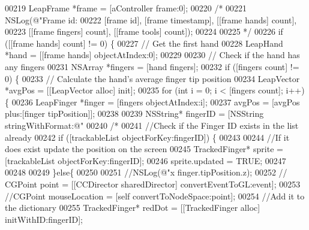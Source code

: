 \begin{DoxyCode}
00219     LeapFrame *frame = [aController frame:0];
00220     \textcolor{comment}{/*}
00221 \textcolor{comment}{     NSLog(@"Frame id: %
00222 \textcolor{comment}{     [frame id], [frame timestamp], [[frame hands] count],}
00223 \textcolor{comment}{     [[frame fingers] count], [[frame tools] count]);}
00224 \textcolor{comment}{     }
00225 \textcolor{comment}{     */}
00226     \textcolor{keywordflow}{if} ([[frame hands] count] != 0) \{
00227         \textcolor{comment}{// Get the first hand}
00228         LeapHand *hand = [[frame hands] objectAtIndex:0];
00229         
00230         \textcolor{comment}{// Check if the hand has any fingers}
00231         NSArray *fingers = [hand fingers];
00232         \textcolor{keywordflow}{if} ([fingers count] != 0) \{
00233             \textcolor{comment}{// Calculate the hand's average finger tip position}
00234             LeapVector *avgPos = [[LeapVector alloc] init];
00235             \textcolor{keywordflow}{for} (\textcolor{keywordtype}{int} i = 0; i < [fingers count]; i++) \{
00236                 LeapFinger *finger = [fingers objectAtIndex:i];
00237                 avgPos = [avgPos plus:[finger tipPosition]];
00238                 
00239                 NSString* fingerID = [NSString stringWithFormat:@"%
00240                 \textcolor{comment}{/*}
00241 \textcolor{comment}{                //Check if the Finger ID exists in the list already}
00242 \textcolor{comment}{                if ([trackableList objectForKey:fingerID]) \{}
00243 \textcolor{comment}{                    }
00244 \textcolor{comment}{                    //If it does exist update the position on the screen}
00245 \textcolor{comment}{                    TrackedFinger* sprite = [trackableList objectForKey:fingerID];}
00246 \textcolor{comment}{                    sprite.updated = TRUE;}
00247 \textcolor{comment}{                    }
00248 \textcolor{comment}{                    }
00249 \textcolor{comment}{                \}else\{}
00250 \textcolor{comment}{                    }
00251 \textcolor{comment}{                    //NSLog(@"x %
       finger.tipPosition.z);}
00252 \textcolor{comment}{                    // CGPoint point = [[CCDirector sharedDirector] convertEventToGL:event];}
00253 \textcolor{comment}{                    //CGPoint mouseLocation = [self convertToNodeSpace:point];}
00254 \textcolor{comment}{                    //Add it to the dictionary}
00255 \textcolor{comment}{                    TrackedFinger* redDot = [[TrackedFinger alloc] initWithID:fingerID];}
}
\end{DoxyCode}
